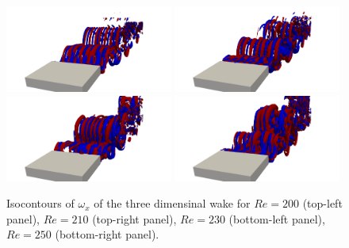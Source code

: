 \begin{figure}
  \centering
  \includegraphics[trim={12cm 0 12cm 0},clip,width=0.49\textwidth]{./fig/Wake/AR4.5Re425.png}     
  \includegraphics[trim={12cm 0 12cm 0},clip,width=0.49\textwidth]{./fig/Wake/AR4.5Re450.png}   
  \includegraphics[trim={12cm 0 12cm 0},clip,width=0.49\textwidth]{./fig/Wake/AR4.5Re475.png} 
  \includegraphics[trim={12cm 0 12cm 0},clip,width=0.49\textwidth]{./fig/Wake/AR4.5Re500.png}
  \caption{Isocontours of $\omega_x$ of the three dimensinal wake for $Re=200$ (top-left panel), $Re=210$ (top-right panel), $Re=230$  (bottom-left panel), $Re=250$ (bottom-right panel).}
  \label{fig:wake1.5}
\end{figure}  

